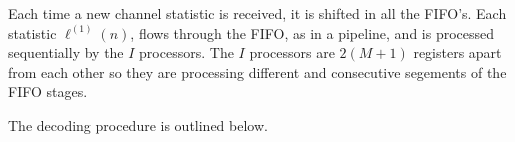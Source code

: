 \documentclass[11pt, oneside, dvipdfmx]{book}
\begin{document}
Each time a new channel statistic is received, it is shifted in all the
FIFO’s. Each statistic $\ell^{(1)}(n)$, flows through the FIFO, as in a pipeline,
and is processed sequentially by the $I$ processors. The $I$ processors are $2(M+1)$ registers apart from each other so they are processing different and consecutive segements of the FIFO stages.

 The decoding procedure is outlined below.
 
\end{document}
